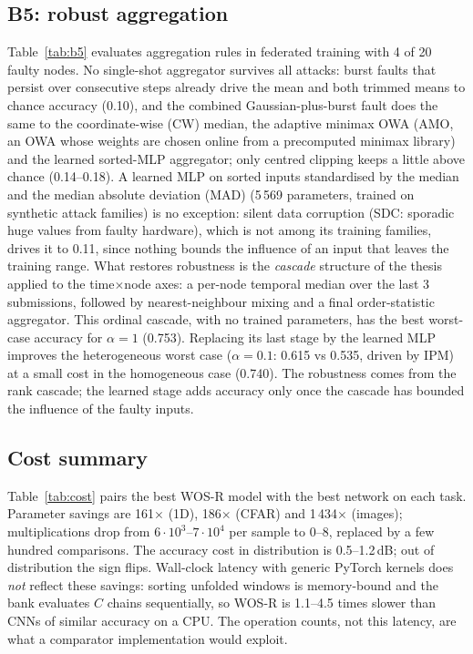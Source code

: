 \documentclass[11pt,a4paper]{article}
\theoremstyle{definition}
\theoremstyle{remark}
\begin{document}


\subsection{B5: robust aggregation}
Table~\ref{tab:b5} evaluates aggregation rules in federated training with 4 of 20 faulty nodes. No single-shot
aggregator survives all attacks: burst faults that persist over consecutive steps already drive the mean and both trimmed
means to chance accuracy (0.10), and the combined Gaussian-plus-burst fault does the same to the coordinate-wise (CW) median,
the adaptive minimax OWA (AMO, an OWA whose weights are chosen online from a precomputed minimax library) and the learned sorted-MLP aggregator; only centred clipping keeps a little above chance (0.14--0.18).
A learned MLP on sorted inputs standardised by the median and the median absolute deviation (MAD) (5\,569 parameters, trained on synthetic attack families) is no
exception: silent data corruption (SDC: sporadic huge
values from faulty hardware), which is not among its training families, drives it to 0.11, since nothing bounds the influence of an input
that leaves the training range. What
restores robustness is the \emph{cascade} structure of the thesis applied to the time$\times$node axes: a per-node
temporal median over the last 3 submissions, followed by nearest-neighbour mixing and a final order-statistic aggregator.
This ordinal cascade, with no trained parameters, has the best worst-case accuracy for $\alpha=1$ (0.753). Replacing its
last stage by the learned MLP improves the heterogeneous worst case ($\alpha=0.1$: 0.615 vs 0.535, driven by IPM) at a
small cost in the homogeneous case (0.740). The robustness comes from the rank cascade; the learned stage adds
accuracy only once the cascade has bounded the influence of the faulty inputs.



\subsection{Cost summary}
Table~\ref{tab:cost} pairs the best WOS-R model with the best network on each task. Parameter savings are 161$\times$ (1D),
186$\times$ (CFAR) and 1\,434$\times$ (images); multiplications drop from $6\cdot10^3$--$7\cdot10^4$ per sample to
0--8, replaced by a few hundred comparisons. The accuracy cost in distribution is 0.5--1.2\,dB; out of distribution the
sign flips. Wall-clock latency with generic PyTorch kernels does \emph{not} reflect these savings: sorting unfolded
windows is memory-bound and the bank evaluates $C$ chains sequentially, so WOS-R is 1.1--4.5 times slower than CNNs of
similar accuracy on a CPU. The operation counts, not this latency, are what a comparator implementation would exploit.
\end{document}
